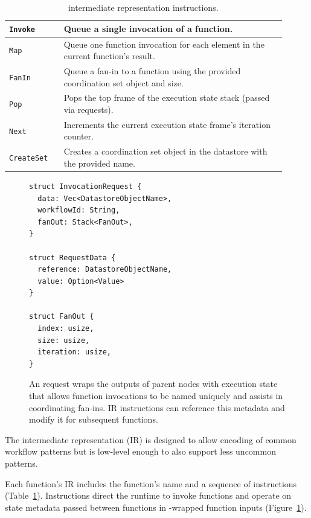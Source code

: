 \begin{table}[t]
  \centering
  \begin{tabular}{|m{0.18\linewidth}|m{0.73\linewidth}|}
    \hline
  \texttt{Invoke} & Queue a single invocation of a function.\\
    \hline
  \texttt{Map} & Queue one function invocation for each element in the current function's result.\\
    \hline
  \texttt{FanIn} & Queue a fan-in to a function using the provided coordination set object and size.\\
    \hline
  \texttt{Pop} & Pops the top frame of the execution state stack (passed via \name{} requests). \\
    \hline
  \texttt{Next} & Increments the current execution state frame's iteration counter.\\
    \hline
  \texttt{CreateSet} & Creates a coordination set object in the datastore with the provided name.\\
    \hline
  \end{tabular}
  \caption{\name{} intermediate representation instructions.}
  \label{table:design:irschema}
\end{table}

\begin{figure}[t]
    \centering
    \begin{verbatim}
struct InvocationRequest {
  data: Vec<DatastoreObjectName>,
  workflowId: String,
  fanOut: Stack<FanOut>,
}

struct RequestData {
  reference: DatastoreObjectName,
  value: Option<Value>
}

struct FanOut {
  index: usize,
  size: usize,
  iteration: usize,
}
    \end{verbatim}
    \caption{An \name{} request wraps the outputs of parent nodes with execution
state that allows function invocations to be named uniquely and assists in
coordinating fan-ins. \name{} IR instructions can reference this metadata and
modify it for subsequent functions.}
    \label{fig:design:unum-request}
\end{figure}

The \name{} intermediate representation (IR) is designed to allow encoding of
common workflow patterns but is low-level enough to also support less uncommon
patterns.

Each function's IR includes the function's name and a sequence of instructions
(Table~\ref{table:design:irschema}). Instructions direct the runtime to invoke
functions and operate on state metadata passed between functions in
\name{}-wrapped function inputs (Figure~\ref{fig:design:unum-request}).

